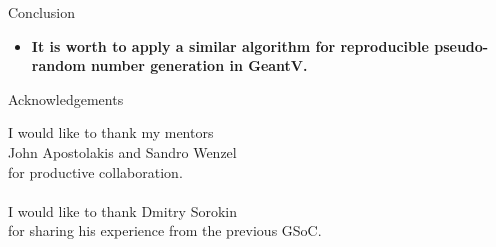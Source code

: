 \documentclass[aspectratio=169, 14pt]{beamer}
\begin{document}
\begin{large}
\begin{frame}{Conclusion}
\begin{itemize}
   \item \bf It is worth to apply a similar algorithm for reproducible pseudo-random number generation in GeantV.
  \end{itemize}

 \end{frame}
 
 \begin{frame}{Acknowledgements}

  \centering
  I would like to thank my mentors\\
  John Apostolakis and Sandro Wenzel\\
  for productive collaboration.\\ \ \\
  
  I would like to thank Dmitry Sorokin\\
  for sharing his experience from the previous GSoC.

 \end{frame}
 
 
 \end{large}
\end{document}
